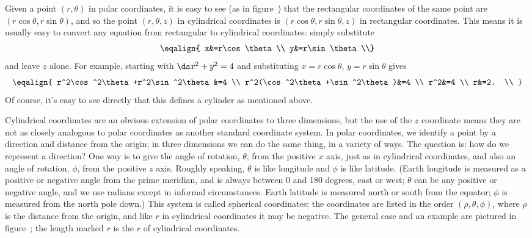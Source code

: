Given a point $(r,\theta)$ in polar coordinates, it is easy 
to see  (as in figure~) that
the rectangular coordinates of the same point are
$(r\cos\theta,r\sin\theta)$, and so the point $(r,\theta,z)$ in
cylindrical coordinates is $(r\cos\theta,r\sin\theta,z)$ in
rectangular coordinates. This means it is usually easy to convert any
equation from rectangular to cylindrical coordinates: simply substitute
$$\eqalign{
  x&=r\cos\theta \\
  y&=r\sin\theta \\}
$$
and leave $z$ alone.
For example,
starting with $\ds x^2+y^2=4$ and substituting $x=r\cos\theta$,
$y=r\sin\theta$ gives 
$$\eqalign{
  r^2\cos^2\theta+r^2\sin^2\theta&=4 \\
  r^2(\cos^2\theta+\sin^2\theta)&=4 \\
  r^2&=4 \\
  r&=2. \\
}$$
Of course, it's easy to see directly that this defines a cylinder as
mentioned above.

Cylindrical coordinates are an obvious extension of polar coordinates
to three dimensions, but the use of the $z$ coordinate means they are
not as closely analogous to polar coordinates as another standard
coordinate system. In polar coordinates, we identify a point by a
direction and distance from the origin; in three dimensions we can do
the same thing, in a variety of ways. The question is: how do we
represent a direction? One way is to give the angle of rotation,
$\theta$, from the positive $x$ axis, just as in cylindrical
coordinates, and also an angle of rotation, $\phi$, from the positive
$z$ axis. Roughly speaking, $\theta$ is like longitude and $\phi$ is
like latitude. (Earth longitude is measured as a positive or negative
angle from the prime meridian, and is always between 0 and 180
degrees, east or west; $\theta$ can be any positive or negative angle,
and we use radians except in informal circumstances. 
Earth latitude is measured north or south
from the equator; $\phi$ is measured from the north pole down.) This
system is called {\dfont spherical coordinates\/}; 
the coordinates are listed in the order
$(\rho,\theta,\phi)$, where $\rho$ is the distance from the
origin, and like $r$ in cylindrical coordinates it may be negative. 
The general case and an
example are pictured in figure~; the
length marked $r$ is the $r$ of cylindrical coordinates.


